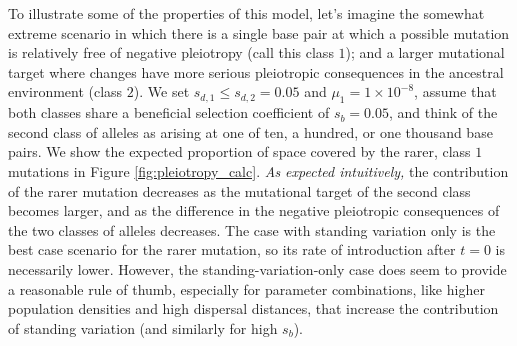 \documentclass{article}
\newcommand{\mfp}[1]{{\it\color{red} #1} }
\begin{document}
To illustrate some of the properties of this model, 
let's imagine the somewhat extreme scenario in which there is a single base pair 
at which a possible mutation is relatively free of negative pleiotropy (call this class $1$);
and a larger mutational target where changes 
have more serious pleiotropic consequences in the ancestral environment (class $2$). 
We set $s_{d,1} \leq s_{d,2}=0.05$ and $\mu_1=1 \times 10^{-8}$, 
assume that both classes share a beneficial selection coefficient of $s_b=0.05$,
and think of the second class of alleles as arising at one of ten, a hundred, or one thousand base pairs. 
We show the expected proportion of space covered by
the rarer, class $1$ mutations in Figure \ref{fig:pleiotropy_calc}.
\mfp{As expected intuitively,} the contribution of the rarer mutation decreases as the
mutational target of the second class becomes larger, and as the
difference in the negative pleiotropic consequences of the two classes of alleles decreases. 
The case with standing variation only is the best case scenario 
for the rarer mutation, so its rate of introduction after $t=0$ is necessarily lower. 
However, the standing-variation-only case does seem to provide a
reasonable rule of thumb, especially for parameter combinations, 
like higher population densities and high dispersal distances, 
that increase the contribution of standing variation (and similarly for high $s_b$). 
\end{document}
